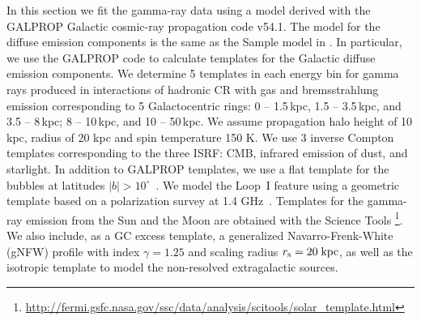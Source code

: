 In this section we fit the gamma-ray data using a model derived with the GALPROP
Galactic cosmic-ray propagation code v54.1.
The model for the diffuse emission components is the same as the Sample model in \cite{2017ApJ...840...43A}.
In particular, we use the GALPROP code to calculate templates for the Galactic diffuse emission components.
We determine 5 templates in each energy bin for gamma rays produced in 
interactions of hadronic CR with gas and bremsstrahlung emission corresponding to 5 Galactocentric rings: 
0 -- 1.5\,kpc, 1.5 -- 3.5\,kpc, and 3.5 -- 8\,kpc; 8 -- 10\,kpc, and 10 -- 50\,kpc.
We assume propagation halo height of 10 kpc, radius of 20 kpc and spin temperature 150 K.
We use 3 inverse Compton templates corresponding to the three ISRF: CMB, 
infrared emission of dust, and starlight.
In addition to GALPROP templates, we use a flat template for the \Fermi bubbles at latitudes $|b| > 10^\circ$~\citep{2014ApJ...793...64A}. 
We model the Loop~I feature using a geometric template \citep[e.g., Figure 2 of][]{2014ApJ...793...64A}
based on a polarization survey at 1.4 GHz~\citep{Wolleben:2007pq}.
Templates for the gamma-ray emission from the Sun  and the Moon
\citep{2008A&A...480..847O, 2011ApJ...734..116A, 2013arXiv1307.0197J, 2016PhRvD..93h2001A}
are obtained with the \Fermi Science Tools%
\footnote{\url{http://fermi.gsfc.nasa.gov/ssc/data/analysis/scitools/solar_template.html}}.
We also include, as a GC excess template, a generalized Navarro-Frenk-White (gNFW) profile with index $\gamma = 1.25$ 
\citep{Goodenough:2009gk,Abazajian:2014fta, Calore:2014xka}
and scaling radius $r_{\rm s} = 20\;{\rm kpc}$, as well as the isotropic template to model the non-resolved 
extragalactic sources.


